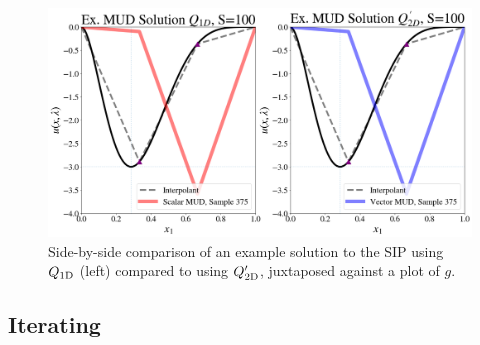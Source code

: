 \begin{frame}[t]

\begin{figure}
  \includegraphics[width=0.95\linewidth]{figures/pde-highd/pde-highd_comp_exmud_D2_m100.png}
\caption{
Side-by-side comparison of an example solution to the SIP using $Q_\text{1D}$ (left) compared to using $Q_\text{2D}^\prime$, juxtaposed against a plot of $g$.
}
\label{fig:pde-highd-2d-scalar-vs-alt}
\end{figure}

\end{frame}


\subsection{Iterating}

